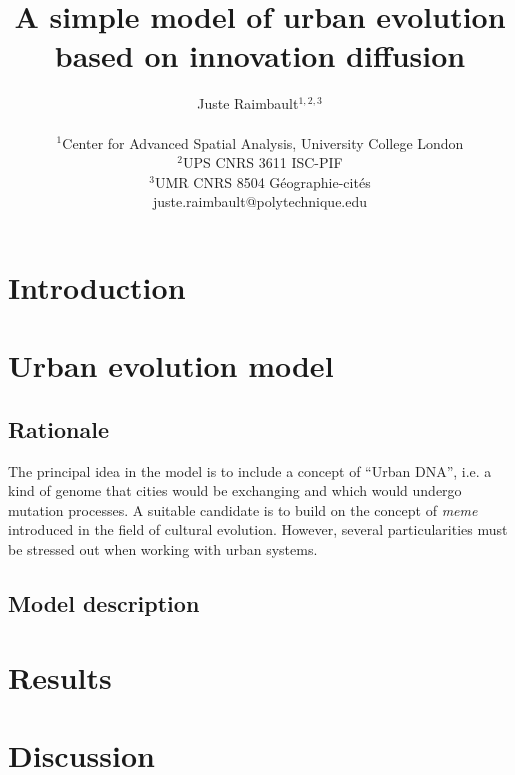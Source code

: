 \documentclass[letterpaper]{article}
\title{A simple model of urban evolution based on innovation diffusion}
\author{Juste Raimbault$^{1,2,3}$\\
\mbox{}\\
$^1$Center for Advanced Spatial Analysis, University College London\\
$^2$UPS CNRS 3611 ISC-PIF\\
$^3$UMR CNRS 8504 G{\'e}ographie-cit{\'e}s\\
juste.raimbault@polytechnique.edu} %
\begin{document}
\maketitle

\begin{abstract}
  
\end{abstract}

\section{Introduction}



\cite{votsis2019urban}

\section{Urban evolution model}

\subsection{Rationale}

The principal idea in the model is to include a concept of ``Urban DNA'', i.e. a kind of genome that cities would be exchanging and which would undergo mutation processes. A suitable candidate is to build on the concept of \emph{meme} introduced in the field of cultural evolution. However, several particularities must be stressed out when working with urban systems.

\cite{d2014urban}

\subsection{Model description}

\cite{favaro2011gibrat}


\section{Results}


\section{Discussion}




\footnotesize

\end{document}
